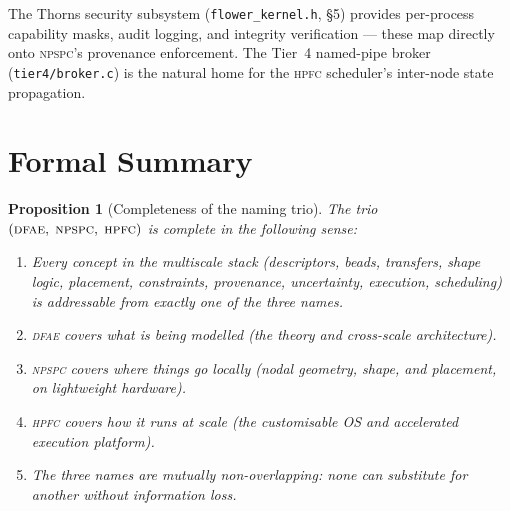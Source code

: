 \documentclass[11pt,a4paper]{article}
\theoremstyle{definition}
\theoremstyle{plain}
\newtheorem{proposition}[definition]{Proposition}
\newcommand{\DFAE}{\textsc{dfae}}
\newcommand{\NPSPC}{\textsc{npspc}}
\newcommand{\HPFC}{\textsc{hpfc}}
\begin{document}
\noindent
The Thorns security subsystem (\texttt{flower\_kernel.h}, \S5)
provides per-process capability masks, audit logging, and integrity
verification --- these map directly onto \NPSPC{}'s provenance
enforcement.  The Tier~4 named-pipe broker
(\texttt{tier4/broker.c}) is the natural home for the \HPFC{}
scheduler's inter-node state propagation.


\section{Formal Summary}
\label{sec:summary}

\begin{proposition}[Completeness of the naming trio]
The trio $(\textsc{dfae},\;\textsc{npspc},\;\textsc{hpfc})$
is \emph{complete} in the following sense:
\begin{enumerate}[label=(\alph*)]
  \item Every concept in the multiscale stack (descriptors, beads,
        transfers, shape logic, placement, constraints, provenance,
        uncertainty, execution, scheduling) is addressable from
        exactly one of the three names.
  \item \DFAE{} covers \emph{what} is being modelled (the theory
        and cross-scale architecture).
  \item \NPSPC{} covers \emph{where} things go locally (nodal
        geometry, shape, and placement, on lightweight hardware).
  \item \HPFC{} covers \emph{how} it runs at scale (the
        customisable OS and accelerated execution platform).
  \item The three names are mutually non-overlapping: none can
        substitute for another without information loss.
\end{enumerate}
\end{proposition}

\bigskip
\begin{center}
\end{center}
\end{document}
